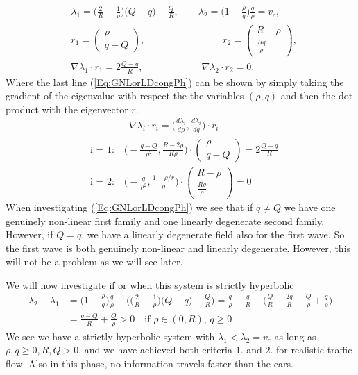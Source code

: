 \documentclass[10pt]{article}
\numberwithin{equation}{section}
\begin{document}
\begin{align}
    &\lambda_1 = \big ( \frac{2}{R} - \frac{1}{\rho} )\big (Q- q) - \frac{Q}{R} , \quad \quad \lambda_2 = \big(1 - \frac{\rho}{q}\big)\frac{q}{\rho} = v_c , \label{Eq:EigenvaluesCongestedPhase} \\
    & r_1 = \begin{pmatrix} \rho \\ q - Q \end{pmatrix}, \quad \quad \quad  \quad \quad \quad \quad \quad  r_2 = \begin{pmatrix} R - \rho \\ \frac{Rq}{\rho} \end{pmatrix} , \label{Eq:EigenvectorsCongPh} \\
    & \nabla \lambda_1 \cdot r_1 = 2\frac{Q-q}{R}, \quad \quad \quad \quad \quad  \quad \nabla \lambda_2 \cdot r_2 = 0 . \label{Eq:GNLorLDcongPh}
\end{align}
Where the last line (\ref{Eq:GNLorLDcongPh}) can be shown by simply taking the gradient of the eigenvalue with respect the the variables $(\rho,q)$ and then the dot product with the eigenvector $r$.
\begin{align*}
    & \quad \quad \quad \quad  \nabla \lambda_i \cdot r_i = \big( \frac{d\lambda_i}{d\rho}, \frac{d\lambda_i}{dq}\big) \cdot r_i \\
    & \text{i = 1:} \quad \big(- \frac{q-Q}{\rho^2}, \frac{R-2\rho}{R\rho} \big) \cdot \begin{pmatrix} \rho \\ q - Q \end{pmatrix} = 2 \frac{Q-q}{R} \\
    & \text{i = 2:} \quad \big(- \frac{q}{\rho^2}, \frac{1-\rho/r}{\rho}\big) \cdot \begin{pmatrix} R - \rho \\ \frac{Rq}{\rho} \end{pmatrix} = 0
\end{align*}
When investigating (\ref{Eq:GNLorLDcongPh}) we see that if $q \neq Q$ we have one genuinely non-linear first family and one linearly degenerate second family. However, if $ Q = q$, we have a linearly degenerate field also for the first wave. So the first wave is both genuinely non-linear and linearly degenerate. However, this will not be a problem as we will see later.

We will now investigate if or when this system is strictly hyperbolic
\begin{align*}
    \lambda_2 - \lambda_1 &= \big(1 - \frac{\rho}{q}\big)\frac{q}{\rho} - \bigg(\big ( \frac{2}{R} - \frac{1}{\rho} )\big (Q- q) - \frac{Q}{R} \bigg) = \frac{q}{\rho} - \frac{q}{R}- \bigg( \frac{Q}{R} - \frac{2q}{R} - \frac{Q}{\rho} + \frac{q}{\rho}\bigg) \\
                        &= \frac{q- Q }{R} + \frac{Q}{\rho} > 0 \quad \text{if $\rho \in (0,R)$, $q \geq 0$}
\end{align*}
We see we have a strictly hyperbolic system with $\lambda_1 < \lambda_2 = v_c$ as long as $\rho,q \geq 0, R, Q > 0$, and we have achieved both criteria $1. $ and $2.$ for realistic traffic flow.  Also in this phase, no information travels faster than the cars. 
\end{document}
